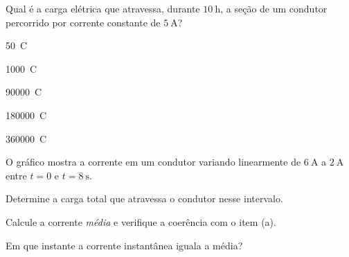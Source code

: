 \begin{questao}[2]{}

Qual é a carga elétrica que atravessa, durante $\SI{10}{\hour}$, a seção de um
condutor percorrido por corrente constante de $\SI{5}{\ampere}$?
\begin{alternativas}[3]
\item \SI{50}{\coulomb}
\item \SI{1000}{\coulomb}
\item \SI{90000}{\coulomb}
\item \SI{180000}{\coulomb}
\item \SI{360000}{\coulomb}
\end{alternativas}


\end{questao}

\blocoaprofundamento
\begin{questao}[3]{}

O gráfico mostra a corrente em um condutor variando linearmente de
$\SI{6}{\ampere}$ a $\SI{2}{\ampere}$ entre $t=0$ e $t=\SI{8}{\second}$.


\begin{itensq}
\item Determine a carga total que atravessa o condutor nesse intervalo.
\item Calcule a corrente \emph{média} e verifique a coerência com o item (a).
\item Em que instante a corrente instantânea iguala a média?
\end{itensq}


\end{questao}
